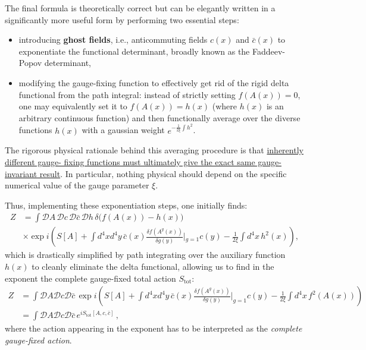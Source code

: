 The final formula is theoretically correct but can be elegantly written in a significantly more useful form by performing two essential steps:
\begin{itemize}
    \item[(i)] introducing \textbf{ghost fields}, i.e., anticommuting fields \(c(x)\) and \(\bar{c}(x)\) to exponentiate the functional determinant, broadly known as the Faddeev-Popov determinant,
    \item[(ii)] modifying the gauge-fixing function to effectively get rid of the rigid delta functional from the path integral: instead of strictly setting \(f(A(x)) = 0\), one may equivalently set it to \(f(A(x)) = h(x)\) (where \(h(x)\) is an arbitrary continuous function) and then functionally average over the diverse functions \(h(x)\) with a gaussian weight \(e^{-\frac{1}{2\xi} \int h^2}\).
\end{itemize}
The rigorous physical rationale behind this averaging procedure is that \uline{inherently different gauge- fixing functions must ultimately give the exact same gauge-invariant result}. In particular, nothing physical should depend on the specific numerical value of the gauge parameter \(\xi\).

Thus, implementing these exponentiation steps, one initially finds:
\[
    \begin{aligned}
        Z & = \int \mathcal{D}A \,\mathcal{D}c\, \mathcal{D}\bar{c}\, \mathcal{D}h \, \delta\Big(f(A(x)) - h(x)\Big)                                                           \\
          & \times \exp i \left( S[A] + \int d^4x d^4y \, \bar{c}(x) \frac{\delta f(A^g(x))}{\delta g(y)}\Bigg\vert{}_{g=1} c(y) - \frac{1}{2\xi} \int d^4x \, h^2(x) \right),
    \end{aligned}
\]
which is drastically simplified by path integrating over the auxiliary function \(h(x)\) to cleanly eliminate the delta functional, allowing us to find in the exponent the complete gauge-fixed total action \(S_{\text{tot}}\):
\begin{equation} \label{eq:path_integral_stot}
    \begin{aligned}
        Z & = \int \mathcal{D}A \mathcal{D}c \mathcal{D}\bar{c} \, \exp i \left( S[A] + \int d^4x d^4y \, \bar{c}(x) \frac{\delta f(A^g(x))}{\delta g(y)}\Bigg|_{g=1} c(y) - \frac{1}{2\xi} \int d^4x \, f^2(A(x)) \right) \\
          & = \int \mathcal{D}A \mathcal{D}c \mathcal{D}\bar{c} \, e^{i S_{\text{tot}}[A, c, \bar{c}]} \, ,
    \end{aligned}
\end{equation}
where the action appearing in the exponent has to be interpreted as the \textit{complete gauge-fixed action}.


